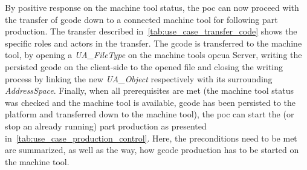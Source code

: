 \documentclass[
a4paper,
twoside,
headsepline,
cleardoublepage=empty,
parskip=half,
draft=false
]{scrbook}
\begin{document}
				By positive response on the machine tool status, the \gls{poc} can now proceed with the transfer of \gls{gcode} down to a connected machine tool for following part production. The transfer described in~\cref{tab:use_case_transfer_code} shows the specific roles and actors in the transfer. The \gls{gcode} is transferred to the machine tool, by opening a \textit{UA\_FileType} on the machine tools \gls{opcua} Server, writing the persisted \gls{gcode} on the client-side to the opened file and closing the writing process by linking the new \textit{UA\_Object} respectively with its surrounding \textit{AddressSpace}.
				Finally, when all prerequisites are met (the machine tool status was checked and the machine tool is available, \gls{gcode} has been persisted to the platform and transferred down to the machine tool), the \gls{poc} can start the (or stop an already running) part production as presented in~\cref{tab:use_case_production_control}. Here, the preconditions need to be met are summarized, as well as the way, how \gls{gcode} production has to be started on the machine tool.
				
\end{document}
